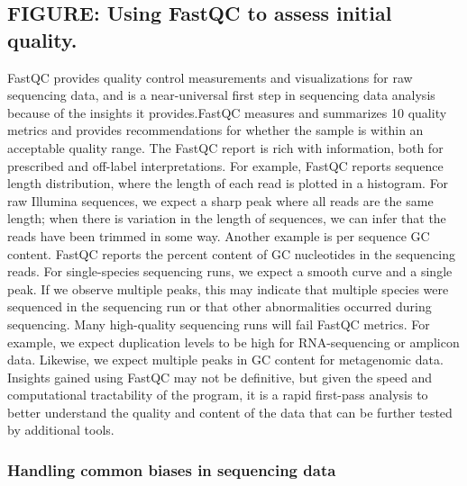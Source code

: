\documentclass[10pt,letterpaper]{article}
\begin{document}
\begin{greybox}{\subsection*{FIGURE: Using FastQC to assess initial quality.}
FastQC provides quality control measurements and visualizations for raw sequencing data, and is a near-universal first step in sequencing data analysis because of the insights it provides.FastQC measures and summarizes 10 quality metrics and provides recommendations for whether the sample is within an acceptable quality range. The FastQC report is rich with information, both for prescribed and off-label interpretations. For example, FastQC reports sequence length distribution, where the length of each read is plotted in a histogram. For raw Illumina sequences, we expect a sharp peak where all reads are the same length; when there is variation in the length of sequences, we can infer that the reads have been trimmed in some way. Another example is per sequence GC content. FastQC reports the percent content of GC nucleotides in the sequencing reads. For single-species sequencing runs, we expect a smooth curve and a single peak. If we observe multiple peaks, this may indicate that multiple species were sequenced in the sequencing run or that other abnormalities occurred during sequencing. Many high-quality sequencing runs will fail FastQC metrics. For example, we expect duplication levels to be high for RNA-sequencing or amplicon data. Likewise, we expect multiple peaks in GC content for metagenomic data. Insights gained using FastQC may not be definitive, but given the speed and computational tractability of the program, it is a rapid first-pass analysis to better understand the quality and content of the data that can be further tested by additional tools.}
\end{greybox}

\subsubsection*{Handling common biases in sequencing data} %
\end{document}
